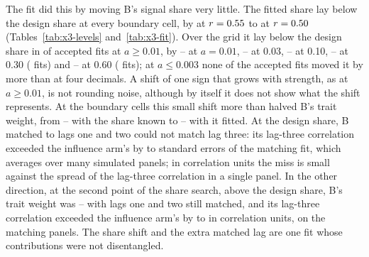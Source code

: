 The fit did this by moving B's signal share very little. The fitted share lay below the design share at every boundary cell, by  at $r=\resultnum{j.x3.free.r_shift.min.r}{0.55}$ to  at $r=\resultnum{j.x3.free.r_shift.max.r}{0.50}$ (Tables~\ref{tab:x3-levels} and~\ref{tab:x3-fit}). Over the grid it lay below the design share in  of  accepted fits at $a\ge0.01$, by -- at $a=0.01$, -- at 0.03, -- at 0.10, -- at 0.30 ( fits) and -- at 0.60 ( fits); at $a\le0.003$ none of the  accepted fits moved it by more than  at four decimals. A shift of one sign that grows with strength, as at $a\ge0.01$, is not rounding noise, although by itself it does not show what the shift represents. At the boundary cells this small shift more than halved B's trait weight, from -- with the share known to -- with it fitted. At the design share, B matched to lags one and two could not match lag three: its lag-three correlation exceeded the influence arm's by  to  standard errors of the matching fit, which averages over many simulated panels; in correlation units the miss is small against the spread of the lag-three correlation in a single panel. In the other direction, at the second point of the share search,  above the design share, B's trait weight was -- with lags one and two still matched, and its lag-three correlation exceeded the influence arm's by  to  in correlation units, on the matching panels. The share shift and the extra matched lag are one fit whose contributions were not disentangled.
